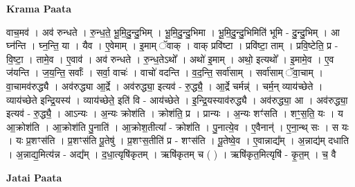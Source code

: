\documentclass[17pt]{extarticle}
\begin{document}
\textbf{Krama Paata} \newline

वाच॒मव॑ । अव॑ रुन्धते । रु॒न्ध॒ते॒ भू॒मि॒दु॒न्दु॒भिम् । भू॒मि॒दु॒न्दु॒भिमा । भू॒मि॒दु॒न्दु॒भिमिति॑ भूमि - दु॒न्दु॒भिम् । 
आ घ्न॑न्ति । घ्न॒न्ति॒ या । यैव । ए॒वेमाम् । इ॒माम् ॅवाक् । वाक् प्रवि॑ष्टा । प्रवि॑ष्टा॒ ताम् । प्रवि॒ष्टेति॒ प्र - वि॒ष्टा॒ । तामे॒व । ए॒वाव॑ । अव॑ रुन्धते । रु॒न्ध॒तेऽथो᳚ । अथो॑ इ॒माम् । अथो॒ इत्यथो᳚ । इ॒मामे॒व । ए॒व ज॑यन्ति । ज॒य॒न्ति॒ सर्वाः᳚ । सर्वा॒ वाचः॑ । वाचो॑ वदन्ति । व॒द॒न्ति॒ सर्वा॑साम् । सर्वा॑साम् ॅवा॒चाम् । वा॒चामव॑रुद्ध्यै । अव॑रुद्ध्या आ॒र्द्रे । अव॑रुद्ध्या॒ इत्यव॑ - रु॒द्ध्यै॒ । आ॒र्द्रे चर्मन्न्॑ । चर्म॒न् व्याय॑च्छेते । व्याय॑च्छेते इन्द्रि॒यस्य॑ । व्याय॑च्छेते॒ इति॑ वि - आय॑च्छेते । इ॒न्द्रि॒यस्याव॑रुद्ध्यै । अव॑रुद्ध्या॒ आ । अव॑रुद्ध्या॒ इत्यव॑ - रु॒द्ध्यै॒ । आऽन्यः । अ॒न्यः क्रोश॑ति । क्रोश॑ति॒ प्र । प्रान्यः । अ॒न्यः शꣳ॑सति । शꣳ॒॒स॒ति॒ यः । य आ॒क्रोश॑ति । आ॒क्रोश॑ति पु॒नाति॑ । आ॒क्रोश॒तीत्या᳚ - क्रोश॑ति । पु॒नात्ये॒व । ए॒वैनान्॑ । ए॒ना॒न्थ् सः । स यः । यः प्र॒शꣳस॑ति । प्र॒शꣳस॑ति पू॒तेषु॑ । प्र॒शꣳस॒तीति॑ प्र - शꣳस॑ति । पू॒तेष्वे॒व । ए॒वान्नाद्य᳚म् । अ॒न्नाद्य॑म् दधाति । अ॒न्नाद्य॒मित्य॑न्न - अद्य᳚म् । द॒धा॒त्यृषि॑कृतम् । ऋषि॑कृतम् च ( ) । ऋषि॑कृत॒मित्यृषि॑ - कृ॒त॒म् । च॒ वै \newline

\textbf{Jatai Paata} \newline
\end{document}
